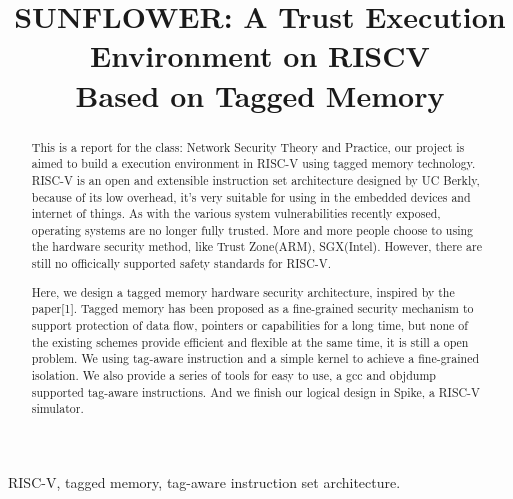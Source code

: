 \documentclass[conference]{IEEEtran}
\begin{document}
\title{\LARGE SUNFLOWER: A Trust Execution Environment on RISCV \\Based on Tagged Memory}
\author{ }

\maketitle
\setlength{\parskip}{0.4\baselineskip}


\begin{abstract}
This is a report for the class: Network Security Theory and Practice, our project is aimed to build a execution environment in RISC-V using tagged memory technology. RISC-V is an open and extensible instruction set architecture designed by UC Berkly, because of its low overhead, it's very suitable for using in the embedded devices and internet of things. As with the various system vulnerabilities recently exposed, operating systems are no longer fully trusted. More and more people choose to using the hardware security method, like Trust Zone(ARM), SGX(Intel). However, there are still no officically supported safety standards for RISC-V.

Here, we design a tagged memory hardware security architecture, inspired by the paper[1]. Tagged memory has been proposed as a fine-grained security mechanism to support protection of data flow, pointers or capabilities for a long time, but none of the existing schemes provide efficient and flexible at the same time, it is still a open problem. We using tag-aware instruction and a simple kernel to achieve a fine-grained isolation. We also provide a series of tools for easy to use, a gcc and objdump supported tag-aware instructions. And we finish our logical design in Spike, a RISC-V simulator.
\end{abstract}

\begin{keywords}
RISC-V, tagged memory, tag-aware instruction set architecture.\\
\end{keywords}

\end{document}
